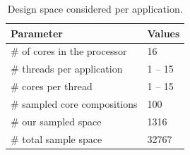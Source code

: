 
\begin{table}[t]
\centering
\begin{tabular} { p{5.2cm}  p{1.8cm} }
      \toprule
      \textbf{Parameter} & \textbf{Values} \\ \midrule
      \# of cores in the processor & 16 \\
      \# threads per application & 1 -- 15 \\
      \# cores per thread & 1 -- 15 \\ \midrule
      \# sampled core compositions & 100 \\ 
      \# our sampled space & 1316 \\
      \# total sample space & 32767 \\ \bottomrule
    \end{tabular}
  \caption{Design space considered per application.}
  \label{tab:space}
\end{table}


